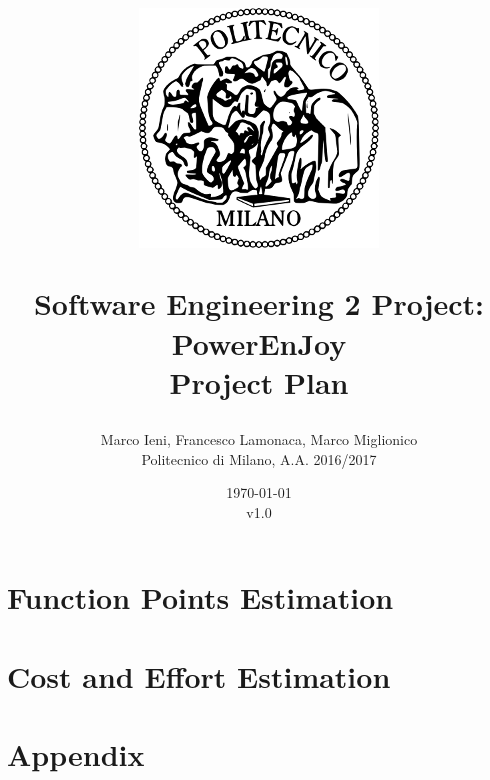 \documentclass[a4paper, 12pt]{report}
\title{
	\begin{figure}[h]
		\centering
		\includegraphics{../common_resources/logo_polimi.png}
	\end{figure}
	\vspace{30px}
	Software Engineering 2 Project: PowerEnJoy \\ \vspace{1em}
	\textbf{P}roject \textbf{P}lan
}
\author{Marco Ieni, Francesco Lamonaca, Marco Miglionico\\Politecnico di Milano, A.A. 2016/2017}
\date{\today\\v1.0}
\begin{document}
\maketitle
\tableofcontents

\chapter{Function Points Estimation}
\label{ch:function_points_estimation}









\chapter{Cost and Effort Estimation}
\label{ch:cost_effor_estimation}



\appendix
\chapter{Appendix}

\end{document}
